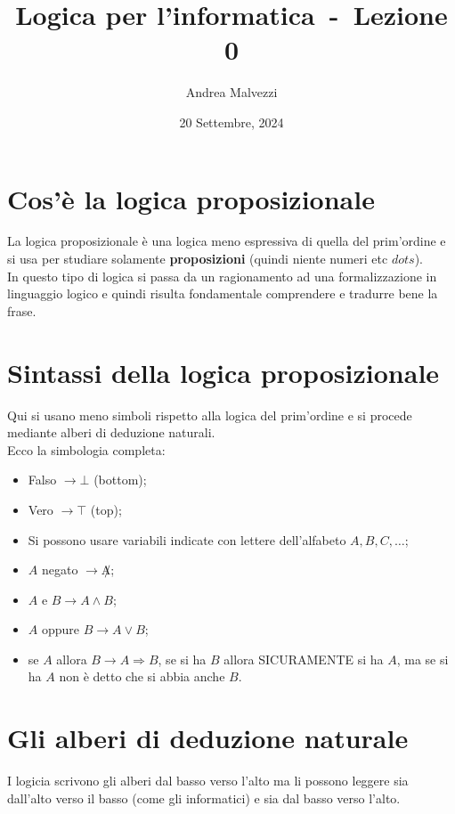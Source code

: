 \documentclass[12pt]{article}
\author{Andrea Malvezzi}
\title{\textbf{Logica per l'informatica~-~Lezione 0}}
\date{20 Settembre, 2024}
\begin{document}
\maketitle
\pagebreak
\tableofcontents
\pagebreak
\section{Cos'è la logica proposizionale}
La logica proposizionale è una logica meno espressiva di quella del prim'ordine e si usa per studiare solamente \textbf{proposizioni} (quindi niente numeri etc $dots$).\\
In questo tipo di logica si passa da un ragionamento ad una formalizzazione in linguaggio logico e quindi risulta fondamentale comprendere e tradurre bene la frase.
\section{Sintassi della logica proposizionale}
Qui si usano meno simboli rispetto alla logica del prim'ordine e si procede mediante alberi di deduzione naturali.\\
Ecco la simbologia completa:
\begin{itemize}
    \item Falso $\rightarrow \bot$ (bottom);
    \item Vero $\rightarrow \top$ (top);
    \item Si possono usare variabili indicate con lettere dell'alfabeto $A, B, C, \dots$;
    \item $A$ negato $\rightarrow \not A$;
    \item $A$ e $B \rightarrow A \wedge B$;
    \item $A$ oppure $B \rightarrow A \vee B$;
    \item se $A$ allora $B \rightarrow A \Rightarrow B$, se si ha $B$ allora SICURAMENTE si ha $A$, ma se si ha $A$ non è detto che si abbia anche $B$.
\end{itemize}
\pagebreak
\section{Gli alberi di deduzione naturale}
I logicia scrivono gli alberi dal basso verso l'alto ma li possono leggere sia dall'alto verso il basso (come gli informatici) e sia dal basso verso l'alto.
\end{document}
